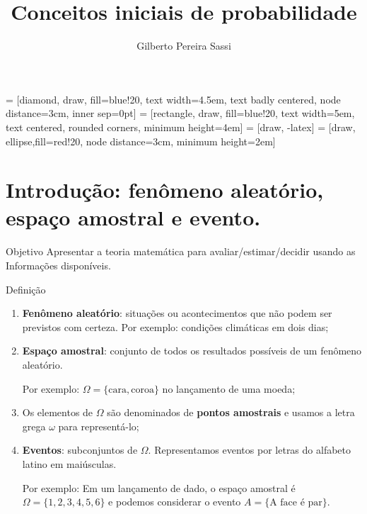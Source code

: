 \documentclass[9pt]{beamer}
\date{}
\title[Probabilidade]{Conceitos iniciais de probabilidade}
\author[Gilberto Sassi]{Gilberto Pereira Sassi}
\institute[IME -- UFBA]{Universidade Federal da Bahia \\ Instituto de Matem\'{a}tica e Estat\'{i}stica\\ Departamento de Estat\'{i}stica }
\begin{document}
	
 = [diamond, draw, fill=blue!20, 
text width=4.5em, text badly centered, node distance=3cm, inner sep=0pt]
 = [rectangle, draw, fill=blue!20, 
text width=5em, text centered, rounded corners, minimum height=4em]
 = [draw, -latex]
 = [draw, ellipse,fill=red!20, node distance=3cm,
minimum height=2em]
	
\begin{frame}{}
	\maketitle
\end{frame}

\section{Introdução: fenômeno aleatório, espaço amostral e evento.}
\begin{frame}{}
 \begin{block}{Objetivo}
  Apresentar a teoria matemática para avaliar/estimar/decidir usando as Informações disponíveis.
 \end{block}

 \begin{block}{Definição}
  \begin{enumerate}
   \item \textbf{Fenômeno aleatório}: situações ou acontecimentos que não podem ser previstos com certeza. Por exemplo: condições climáticas em dois dias;
   \item \textbf{Espaço amostral}: conjunto de todos os resultados possíveis de um fenômeno aleatório. 
   
   Por exemplo: $\Omega = \{\mbox{cara}, \mbox{coroa}\}$ no lançamento de uma moeda;
   \item Os elementos de $\Omega$ são denominados de \textbf{pontos amostrais} e usamos a letra grega $\omega$ para representá-lo;
   \item \textbf{Eventos}: subconjuntos de $\Omega$. Representamos eventos por letras do alfabeto latino em maiúsculas.
   
   Por exemplo: Em um lançamento de dado, o espaço amostral é $\Omega = \{1,2,3,4,5,6\}$ e podemos considerar o evento $A = \{\mbox{A face é par}\}$.
  \end{enumerate}
 \end{block}

\end{frame}
\end{document}
